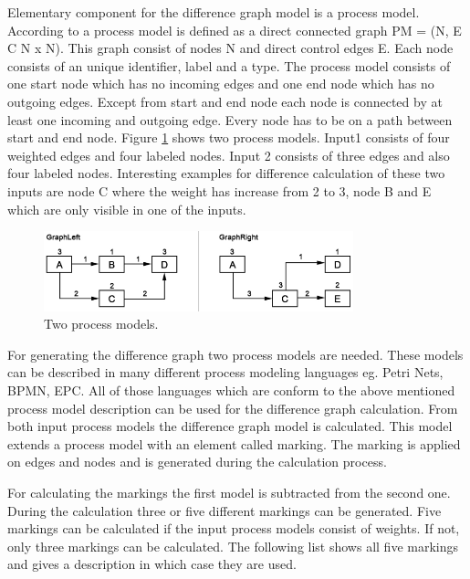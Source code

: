 \documentclass{llncs}
\begin{document}
Elementary component for the difference graph model is a process model. According to \cite{lit:VisuApprDiffAnalysis} a process model is defined as a direct connected graph PM = (N, E C N x N). This graph consist of nodes N and direct control edges E. Each node consists of an unique identifier, label and a type.
The process model consists of one start node which has no incoming edges and one end node which has no outgoing edges. Except from start and end node each node is connected by at least one incoming and outgoing edge. Every node has to be on a path between start and end node. Figure \ref{fig:ProcessModels} shows two process models. Input1 consists of four weighted edges and four labeled nodes. Input 2 consists of three edges and also four labeled nodes. Interesting examples for difference calculation of these two inputs are node C where the weight has increase from 2 to 3, node B and E which are only visible in one of the inputs.

\begin{figure}
	\centering
	\includegraphics[width=0.8\textwidth]{Images/ProcessModels.PNG}
	\caption{Two process models.}
	\label{fig:ProcessModels}
\end{figure}

For generating the difference graph two process models are needed. These models can be described in many different process modeling languages eg. Petri Nets, BPMN, EPC. All of those languages which are conform to the above mentioned process model description can be used for the difference graph calculation. From both input process models the difference graph model is calculated. This model extends a process model with an element called marking. The marking is applied on edges and nodes and is generated during the calculation process.


For calculating the markings the first model is subtracted from the second one. During the calculation three or five different markings can be generated. Five markings can be calculated if the input process models consist of weights. If not, only three markings can be calculated. The following list shows all five markings and gives a description in which case they are used. 
\end{document}

